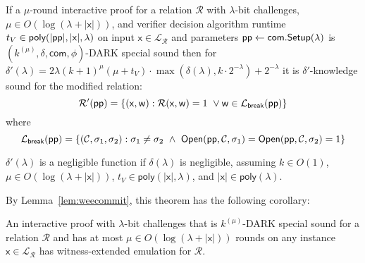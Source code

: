 \begin{theorem}\label{thm:DARKExtractor} If a $\mu$-round interactive proof for a relation $\mathcal{R}$ with $\lambda$-bit challenges, $\mu \in O(\log(\lambda + |\mathsf{x}|))$, and verifier decision algorithm runtime $t_V \in \textsf{poly}(|\textsf{pp}|, |\mathsf{x}|, \lambda)$ on input $\mathsf{x} \in \mathcal{L}_\mathcal{R}$ and parameters $\textsf{pp} \gets \textsf{com}.\textsf{{Setup}}(\lambda)$ is $(k^{(\mu)}, \delta, \textsf{com}, \phi)$-DARK special sound then for $\delta'(\lambda) = 2\lambda (k+1)^\mu (\mu + t_V) \cdot \max(\delta(\lambda), k \cdot 2^{-\lambda}) + 2^{-\lambda}$ it is $\delta'$-knowledge sound for the modified relation:
$$\mathcal{R'}(\textsf{pp}) = \{(\mathsf{x}, \mathsf{w}): \mathcal{R}(\mathsf{x}, \mathsf{w}) = 1 \  \vee \mathsf{w} \in \mathcal{L}_\textsf{break}(\textsf{pp})\} $$
 where 
 $$\mathcal{L}_\textsf{break}(\crs) = \{ (\mathcal{C}, \sigma_1, \sigma_2) :   \sigma_1 \neq \sigma_2 \ \wedge \ \open(\crs,\mathcal{C}, \sigma_1) = \open(\crs,\mathcal{C}, \sigma_2) = 1    \} $$ 

\end{theorem} 
\begin{remark} $\delta'(\lambda)$ is a negligible function if $\delta(\lambda)$ is negligible, assuming $k \in O(1)$, $\mu \in O(\log(\lambda + |\mathsf{x}|))$, $t_V \in \textsf{poly}(|\mathsf{x}|, \lambda)$, and $|\mathsf{x}| \in \textsf{poly}(\lambda)$. 	
\end{remark}

By Lemma~\ref{lem:weecommit}, this theorem has the following corollary:
\begin{corollary}
An interactive proof with $\lambda$-bit challenges that is $k^{(\mu)}$-DARK special sound for a relation $\mathcal{R}$ and has at most $\mu \in O(\log(\lambda + |\mathsf{x}|))$ rounds on any instance $\mathsf{x} \in \mathcal{L}_\mathcal{R}$ has witness-extended emulation for $\mathcal{R}$.  
\end{corollary}



